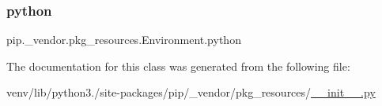 \subsubsection{\texorpdfstring{python}{python}}
{\footnotesize\ttfamily pip.\+\_\+vendor.\+pkg\+\_\+resources.\+Environment.\+python}



The documentation for this class was generated from the following file\+:\begin{DoxyCompactItemize}
\item 
venv/lib/python3./site-\/packages/pip/\+\_\+vendor/pkg\+\_\+resources/\hyperlink{venv_2lib_2python3_89_2site-packages_2pip_2__vendor_2pkg__resources_2____init_____8py}{\+\_\+\+\_\+init\+\_\+\+\_\+.\+py}\end{DoxyCompactItemize}
